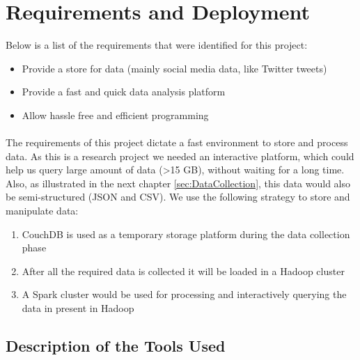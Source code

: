 \documentclass[12pt]{report}
\theoremstyle{named}
\begin{document}
\section{Requirements and Deployment}
Below is a list of the requirements that were identified for this project:
\begin{itemize}
  \item Provide a store for data (mainly social media data, like Twitter tweets) 
  \item Provide a fast and quick data analysis platform
  \item Allow hassle free and efficient programming
\end{itemize}

\paragraph{}
The requirements of this project dictate a fast environment to store and process data. As this is a research project we needed an interactive platform, which could help us query large amount of data (\textgreater15 GB), without waiting for a long time. Also, as illustrated in the next chapter \ref{sec:DataCollection}, this data would also be semi-structured (JSON and CSV). We use the following strategy to store and manipulate data:
\begin{enumerate}
  \item CouchDB is used as a temporary storage platform during the data collection phase
  \item After all the required data is collected it will be loaded in a Hadoop cluster
  \item A Spark cluster would be used for processing and interactively querying the data in present in Hadoop
\end{enumerate}



\subsection{Description of the Tools Used}
\end{document}
